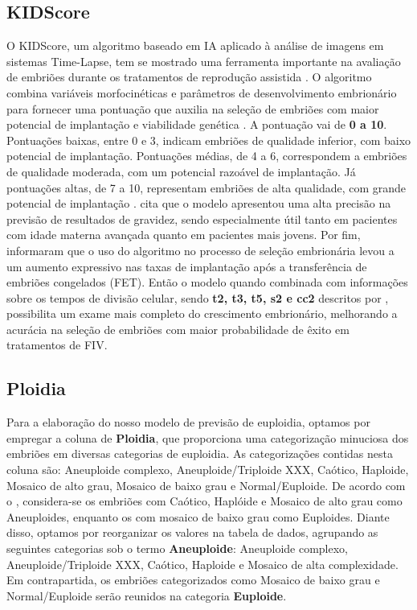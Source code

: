\subsection{KIDScore\texttrademark}  

O KIDScore\texttrademark{}, um algoritmo baseado em IA aplicado à análise de imagens em sistemas Time-Lapse, tem se mostrado uma ferramenta importante na avaliação de embriões durante os tratamentos de reprodução assistida \cite{kato2021}. O algoritmo combina variáveis morfocinéticas e parâmetros de desenvolvimento embrionário para fornecer uma pontuação que auxilia na seleção de embriões com maior potencial de implantação e viabilidade genética \cite{gazzo2020}. A pontuação vai de \textbf{0 a 10}. Pontuações baixas, entre 0 e 3, indicam embriões de qualidade inferior, com baixo potencial de implantação. Pontuações médias, de 4 a 6, correspondem a embriões de qualidade moderada, com um potencial razoável de implantação. Já pontuações altas, de 7 a 10, representam embriões de alta qualidade, com grande potencial de implantação \cite{gazzo2020}.  cita que o modelo apresentou uma alta precisão na previsão de resultados de gravidez, sendo especialmente útil tanto em pacientes com idade materna avançada quanto em pacientes mais jovens. Por fim,  informaram que o uso do algoritmo no processo de seleção embrionária levou a um aumento expressivo nas taxas de implantação após a transferência de embriões congelados (FET). Então o modelo quando combinada com informações sobre os tempos de divisão celular, sendo \textbf{t2, t3, t5, s2 e cc2} descritos por , possibilita um exame mais completo do crescimento embrionário, melhorando a acurácia na seleção de embriões com maior probabilidade de êxito em tratamentos de FIV.

\subsection{Ploidia}
Para a elaboração do nosso modelo de previsão de euploidia, optamos por empregar a coluna de \textbf{Ploidia}, que proporciona uma categorização minuciosa dos embriões em diversas categorias de euploidia. As categorizações contidas nesta coluna são: Aneuploide complexo, Aneuploide/Triploide XXX, Caótico, Haploide, Mosaico de alto grau, Mosaico de baixo grau e Normal/Euploide. De acordo com o , considera-se os embriões com Caótico, Haplóide e Mosaico de alto grau como Aneuploides, enquanto os com mosaico de baixo grau como Euploides. Diante disso, optamos por reorganizar os valores na tabela de dados, agrupando as seguintes categorias sob o termo \textbf{Aneuploide}: Aneuploide complexo, Aneuploide/Triploide XXX, Caótico, Haploide e Mosaico de alta complexidade. Em contrapartida, os embriões categorizados como Mosaico de baixo grau e Normal/Euploide serão reunidos na categoria \textbf{Euploide}.

